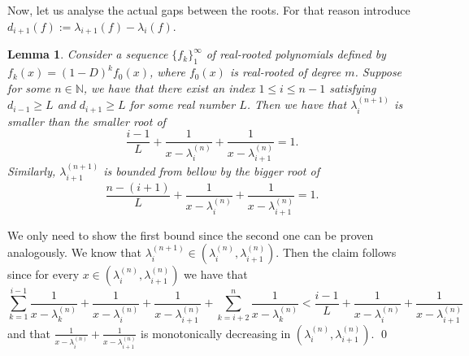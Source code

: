 \documentclass[11pt]{article}
\DeclareMathOperator{\AG}{AG}
\newtheorem{lemma}[theorem]{Lemma}
\begin{document}
\begin{comment}
\[|\lambda^{(n+1)}_3 - \lambda^{(n+1)}_2|\ge |\mu_2 - \mu_1| = \sqrt{|\lambda^{(n)}_3 - \lambda^{(n)}_2|^2 + \frac{4}{(1+\varepsilon)^2}} > \sqrt{|\lambda^{(n)}_3 - \lambda^{(n)}_2|^2 +4}.\]
Clearly, this implies that $|\lambda^{(N + k)}_3 - \lambda^{(N+k)}_2|$ is monotonically increasing sequence. Assuming it has a finite limit $l$, leads to $l > \sqrt{l^2 +4}$, which is absurd. Hence, $\lim_{n\to \infty} |\lambda^{(n)}_3 - \lambda^{(n)}_2|=\lim_{k\to \infty} |\lambda^{(N + k)}_3 - \lambda^{(N+k)}_2| = \infty,$ as claimed.

\textbf{2 case:}
Suppose now that for every $M$, there exist $m, k > M$ such that $\alpha_n > \beta_n$ and $\beta_k > \alpha_k$. Let $l$ be an index for "transition", i.e. $\alpha_l > \beta_l$ and $\beta_{l+1} > \alpha_{l+1}$ or vice versa. Without loss of generality, we are in the first situation. Recall that the $(1-D)$ operator moves $\lambda^{(l)}_{1}$ to the right by at most 1, $\lambda^{(l)}_{2}$ - by at most 2, and $\lambda^{(l)}_{3}$ - by at most 3. Therefore, $\alpha_{l+1} > \alpha_l - 1$ and $\beta_{l+1} < \beta_l + 3$. Combining these two inequalities with $\alpha_l > \beta_l$ and $\beta_{l+1} > \alpha_{l+1}$ leads to $\beta_l > \frac{\AG(f_l)}{2} - 2$. Since $l$ can be arbitrarily big, so can be $\AG(f_l)$. Due to Lemma~\ref{minimal gap increases}, this implies that the minimal gap between roots goes unbounded. In particular, $\lim \alpha_n = \lim \beta_n = \infty$.
\qed
\end{comment}

Now, let us analyse the actual gaps between the roots. For that reason introduce $d_{i+1}(f) := \lambda_{i+1}(f) - \lambda_i(f)$.

\begin{lemma}
\label{minimal gap shall approach}
 Consider a sequence $\{f_k\}_1^\infty$ of real-rooted polynomials defined by $f_k(x) = (1-D)^k f_0(x)$, where $f_0(x)$ is real-rooted of degree $m$. Suppose for some $n\in\mathbb{N}$, we have that there exist an index $1\leq i\leq n-1$ satisfying $d_{i-1} \geq L$ and $d_{i+1} \geq L$ for some real number $L$. Then we have that $\lambda^{(n+1)}_i$ is smaller than the smaller root of
 \[\frac{i-1}{L}+\frac{1}{x-\lambda^{(n)}_i} + \frac{1}{x-\lambda^{(n)}_{i+1}} = 1.\]
 Similarly, $\lambda^{(n+1)}_{i+1}$ is bounded from bellow by the bigger root of 
 \[\frac{n-(i+1)}{L}+\frac{1}{x-\lambda^{(n)}_i} + \frac{1}{x-\lambda^{(n)}_{i+1}} = 1.\]
\end{lemma}
\proof
We only need to show the first bound since the second one can be proven analogously. We know that $\lambda^{(n+1)}_i\in(\lambda^{(n)}_i,\lambda^{(n)}_{i+1})$. Then the claim follows since for every $x\in (\lambda^{(n)}_i,\lambda^{(n)}_{i+1})$ we have that
\[\sum^{i-1}_{k=1} \frac{1}{x-\lambda^{(n)}_k} + \frac{1}{x-\lambda^{(n)}_i} + \frac{1}{x-\lambda^{(n)}_{i+1}} + \sum^n_{k = i+2} \frac{1}{x-\lambda^{(n)}_k} < \frac{i-1}{L}+\frac{1}{x-\lambda^{(n)}_i} + \frac{1}{x-\lambda^{(n)}_{i+1}} \]
and that $\frac{1}{x-\lambda^{(n)}_i} + \frac{1}{x-\lambda^{(n)}_{i+1}}$ is monotonically decreasing in $(\lambda^{(n)}_i,\lambda^{(n)}_{i+1})$.
\qed
\end{document}
